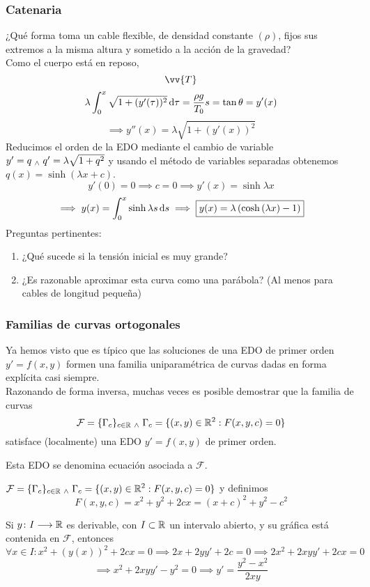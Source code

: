 \subsubsection{Catenaria}
¿Qué forma toma un cable flexible, de densidad constante $(\rho)$, fijos sus extremos a la misma altura y sometido a la acción de la gravedad?\\
\indent Como el cuerpo está en reposo,
\[\vv{T}\]
\[\lambda\int_0^x\sqrt{1+(y'(\tau))^2}\odif{\tau}=\frac{\rho g}{T_0}s=\tan{\theta}=y'(x)\]
\[\implies y''(x)=\lambda\sqrt{1+(y'(x))^2}\]
Reducimos el orden de la EDO mediante el cambio de variable $y'=q \; _{\wedge} \; q'=\lambda\sqrt{1+q^2}$ y usando el método de variables separadas obtenemos $q(x)=\sinh{(\lambda x +c)}$.
\[y'(0)=0 \implies c=0 \implies y'(x)=\sinh{\lambda x}\]
\[\implies y(x)=\int_0^x \sinh{\lambda s} \odif{s}\implies \boxed{y(x)=\lambda \left(\cosh{(\lambda x)}-1\right)}\]
Preguntas pertinentes:
\begin{enumerate}
	\item ¿Qué sucede si la tensión inicial es muy grande?
	\item ¿Es razonable aproximar esta curva como una parábola? (Al menos para cables de longitud pequeña)
\end{enumerate}
\subsubsection{Familias de curvas ortogonales}

Ya hemos visto que es típico que las soluciones de una EDO de primer orden $y'=f(x,y)$ formen una familia uniparamétrica de curvas dadas en forma explícita casi siempre. \\
\indent Razonando de forma inversa, muchas veces es posible demostrar que la familia de curvas
\[\mathcal{F} = \{\Gamma_c\}_{c\in \mathbb{R}} \; _{\wedge} \; \Gamma_c=\{(x,y)\in \mathbb{R}^2:F(x,y,c)=0\}\]
satisface (localmente) una EDO $y'=f(x,y)$ de primer orden.
\begin{defn}
	Esta EDO se denomina ecuación asociada a $\mathcal{F}$.
\end{defn}

\begin{ejem} \label{circums}
	$\displaystyle \mathcal{F} = \{\Gamma_c\}_{c\in \mathbb{R}} \; _{\wedge} \; \Gamma_c=\{(x,y)\in \mathbb{R}^2:F(x,y,c)=0\}$ y definimos
	\[F(x,y,c)=x^2+y^2+2cx=(x+c)^2+y^2-c^2\] \begin{figure}[htbp]
		\centering
		\vspace{-0.7cm} %
		
		\vspace{-0.2cm} %
	\end{figure}

	\noindent Si $y \colon I \longrightarrow \mathbb{R}$ es derivable, con $I\subset\mathbb{R}$ un intervalo abierto, y su gráfica está contenida en $\mathcal{F}$, entonces $\forall x \in I : x^2+(y(x))^2+2cx=0 \implies 2x+2yy'+2c=0\implies 2x^2+2xyy'+2cx=0$
	\[\implies x^2+2xyy'-y^2=0 \implies y'=\frac{y^2-x^2}{2xy}\]
\end{ejem}

